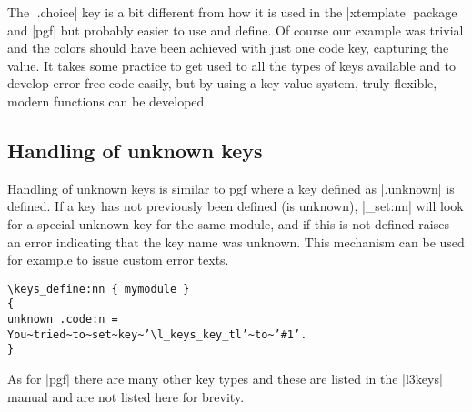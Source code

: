 The |.choice|  key is a bit different from how it is used in the |xtemplate| package and |pgf| but probably easier to use and define. Of course our example was trivial and the colors should have been achieved with just one code key, capturing the value. It takes some practice to get used to all the types of keys available and to develop error free code easily, but by using a key value system, truly flexible, modern functions can be developed.
 

\subsection{Handling of unknown keys}
 
 Handling of unknown keys is similar to pgf where a key defined as |.unknown| is defined. 
 If a key has not previously been defined (is unknown), |\keys_set:nn| will look for a special
unknown key for the same module, and if this is not defined raises an error indicating that
the key name was unknown. This mechanism can be used for example to issue custom
error texts.

\begin{verbatim}
\keys_define:nn { mymodule }
{
unknown .code:n =
You~tried~to~set~key~’\l_keys_key_tl’~to~’#1’.
}
\end{verbatim}
 
 
 As for |pgf| there are many other key types and these are listed in the |l3keys| manual and are not listed here for brevity. 
 
 